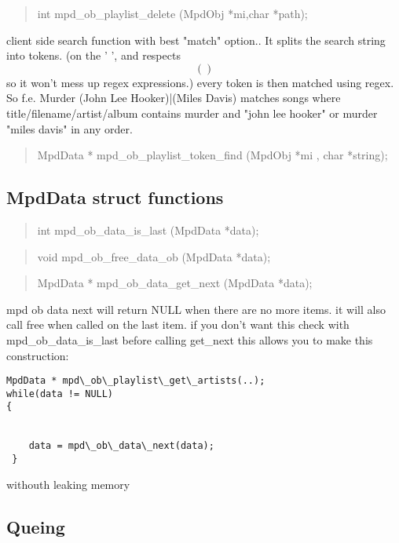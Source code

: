 \documentclass[a4paper,11pt]{article}
\begin{document}
\begin{quote}
int 		mpd\_ob\_playlist\_delete			(MpdObj *mi,char *path);
\end{quote}

client side search function with best "match" option..
It splits the search string into tokens. (on the ' ', and respects \[()\] so it won't mess up regex expressions.)  every token is then matched using regex.
So f.e. Murder (John Lee Hooker)|(Miles Davis)  matches songs where title/filename/artist/album contains murder and "john lee hooker" 
or murder "miles davis" in any order.\\
{\color{red}{Warning: This function can be slow. For better performance use the server side use.}}

\begin{quote}
MpdData *	mpd\_ob\_playlist\_token\_find		(MpdObj *mi , char *string);
\end{quote}

\subsection{MpdData struct functions}

\begin{quote}
int 		mpd\_ob\_data\_is\_last			(MpdData *data);
\end{quote}

\begin{quote}
void 		mpd\_ob\_free\_data\_ob			(MpdData *data);
\end{quote}

\begin{quote}
MpdData * 	mpd\_ob\_data\_get\_next			(MpdData *data);
\end{quote}

mpd ob data next will return NULL when there are no more items. it will also call free when called on the last item.
if you don't want this check with mpd\_ob\_data\_is\_last before calling get\_next
this allows you to make this construction:

\begin{verbatim}
MpdData * mpd\_ob\_playlist\_get\_artists(..);
while(data != NULL)
{


	data = mpd\_ob\_data\_next(data);
 }
\end{verbatim}

withouth leaking memory 


\subsection{Queing}
\end{document}
